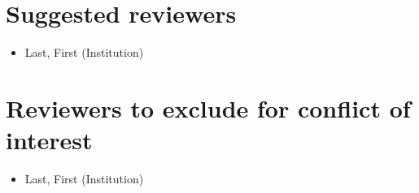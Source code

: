 \documentclass[fontsize=10pt,paper=letter,twoside=false,onecolumn]{scrartcl} %
\begin{document}
\section{Suggested reviewers}
\begin{itemize}
	\item Last, First (Institution)
\end{itemize}
\section{Reviewers to exclude for conflict of interest}
\begin{itemize}
	\item Last, First (Institution)
\end{itemize}
\end{document}
